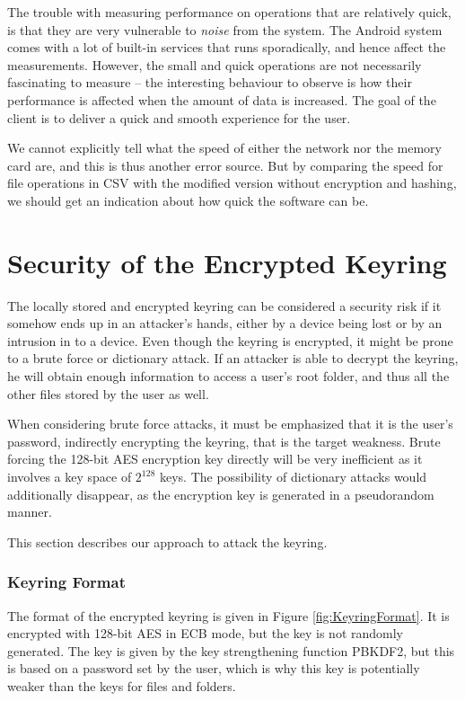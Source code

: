 \documentclass[pdftex,english,10pt,b5paper,twoside]{book}
\begin{document}
The trouble with measuring performance on operations that are relatively quick,
is that they are very vulnerable to \emph{noise} from the system. The Android
system comes with a lot of built-in services that runs sporadically, and hence
affect the measurements. However, the small and quick operations are not
necessarily fascinating to measure -- the interesting behaviour to observe is
how their performance is affected when the amount of data is increased. The
goal of the client is to deliver a quick and smooth experience for the user.

We cannot explicitly tell what the speed of either the network nor the memory
card are, and this is thus another error source. But by comparing the speed for
file operations in \ac{CSV} with the modified version without encryption and
hashing, we should get an indication about how quick the software can be.

\section{Security of the Encrypted Keyring}
\label{sec:BFLK}

The locally stored and encrypted keyring can be considered a security risk if
it somehow ends up in an attacker's hands, either by a device being lost or by
an intrusion in to a device. Even though the keyring is encrypted, it might be
prone to a brute force or dictionary attack. If an attacker is able to decrypt
the keyring, he will obtain enough information to access a user's root folder,
and thus all the other files stored by the user as well.

When considering brute force attacks, it must be emphasized that it is the
user's password, indirectly encrypting the keyring, that is the target weakness.
Brute forcing the 128-bit AES encryption key directly will be very inefficient
as it involves a key space of $2^{128}$ keys. The possibility of dictionary
attacks would additionally disappear, as the encryption key is generated in a
pseudorandom manner.

This section describes our approach to attack the keyring.

\subsubsection{Keyring Format}

The format of the encrypted keyring is given in Figure \ref{fig:KeyringFormat}.
It is encrypted with 128-bit \ac{AES} in \ac{ECB} mode, but the key is not
randomly generated. The key is given by the key strengthening function
\ac{PBKDF2}, but this is based on a password set by the user, which is why this
key is potentially weaker than the keys for files and folders.
\end{document}
